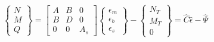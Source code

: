 \documentclass[12pt]{article}
\numberwithin{equation}{section}
\begin{document}
\begin{equation}
    \begin{Bmatrix}
        N \\
        M \\
        Q
    \end{Bmatrix} =
    \begin{bmatrix}
        A & B & 0   \\
        B & D & 0   \\
        0 & 0 & A_s
    \end{bmatrix}
    \begin{Bmatrix}
        \epsilon_m \\
        \epsilon_b \\
        \epsilon_s
    \end{Bmatrix}
    -
    \begin{Bmatrix}
        N_T \\
        M_T \\
        0
    \end{Bmatrix}
    = \hat{C} \hat{\epsilon} - \hat{\Psi}
    \label{eq:stress_resultants}
\end{equation}
\end{document}

